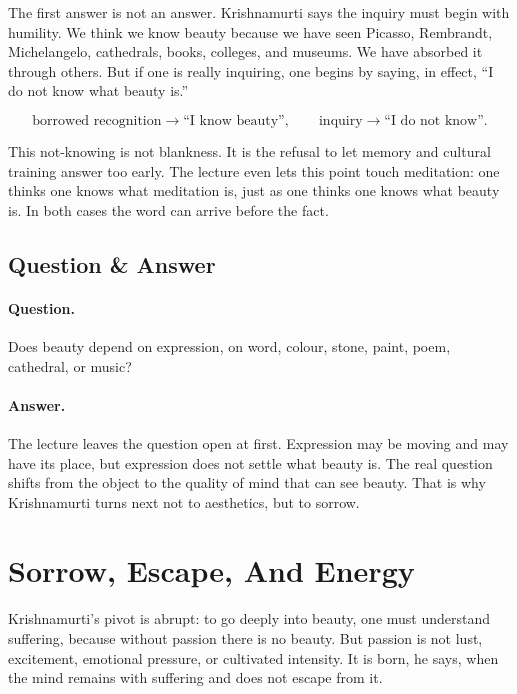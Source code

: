 \documentclass[11pt,oneside]{book}
\begin{document}
The first answer is not an answer. Krishnamurti says the inquiry must begin with humility. We think we know beauty because we have seen Picasso, Rembrandt, Michelangelo, cathedrals, books, colleges, and museums. We have absorbed it through others. But if one is really inquiring, one begins by saying, in effect, ``I do not know what beauty is.''

\begin{equation}
\text{borrowed recognition}
\longrightarrow
\text{``I know beauty''},
\qquad
\text{inquiry}
\longrightarrow
\text{``I do not know''}.
\end{equation}

This not-knowing is not blankness. It is the refusal to let memory and cultural training answer too early. The lecture even lets this point touch meditation: one thinks one knows what meditation is, just as one thinks one knows what beauty is. In both cases the word can arrive before the fact.

\subsection{Question \& Answer}

\paragraph{Question.}
Does beauty depend on expression, on word, colour, stone, paint, poem, cathedral, or music?

\paragraph{Answer.}
The lecture leaves the question open at first. Expression may be moving and may have its place, but expression does not settle what beauty is. The real question shifts from the object to the quality of mind that can see beauty. That is why Krishnamurti turns next not to aesthetics, but to sorrow.

\section{Sorrow, Escape, And Energy}

Krishnamurti's pivot is abrupt: to go deeply into beauty, one must understand suffering, because without passion there is no beauty. But passion is not lust, excitement, emotional pressure, or cultivated intensity. It is born, he says, when the mind remains with suffering and does not escape from it.
\end{document}
